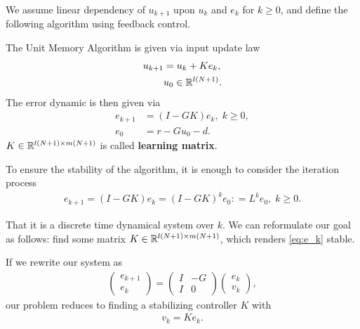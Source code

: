 We assume linear dependency of $u_{k+1}$ upon $u_k$ and $e_k$ for $k \geq 0$, and define the following algorithm using feedback control. 
\begin{alg}
	\label{alg: unitMemory}
	The Unit Memory Algorithm is given via input update law 
	\begin{align}
	\label{eq:clPlant}
	\begin{split}
	u_{k+1} &= u_k + K e_k, \\
	& u_0 \in {\mathbb{R}}^{l (N+1)}.
	\end{split}
	\end{align}	 
	The error dynamic is then given via
	\begin{align}
	e _{k+1} &= (I - G K) e_{k}, \; k \geq 0,\\
	e_0 &= r -  Gu_0 -d.
	\end{align}
	$K \in {\mathbb{R}}^{l(N+1) \times m(N+1)}$ is called \textbf{learning matrix}. 
\end{alg}

To ensure the stability of the algorithm, it is enough to consider the iteration process 
\begin{align}
\label{eq:e_k}
e_{k+1} = (I - G K) e_k = (I - G K)^k e_0  : =  L^k e_{0}, \; k \geq 0.
\end{align}

That it is a discrete time dynamical system over $k$. We can reformulate our goal as follows: find some matrix $K \in {\mathbb{R}}^{l(N+1) \times m (N+1)}$, which renders \eqref{eq:e_k} stable. %

If we rewrite our system as
\begin{align}
\label{eq:ILC:e_kPlant}
\begin{pmatrix}
e_{k+1} \\ e_k
\end{pmatrix} = 
\left(
\begin{array}{c|c}
I & -G \\\hline I & 0
\end{array}\right) \begin{pmatrix}
e_k \\ v_k 
\end{pmatrix},
\end{align}
our problem reduces to finding a stabilizing controller $K$  with 
\begin{align}
v_k = K e_k.
\end{align} 

